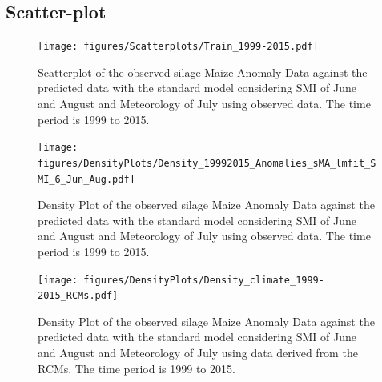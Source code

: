 \documentclass[12pt]{iopart}
\begin{document}
\subsection{Scatter-plot}

\label{scatter:1}

\begin{figure}
	\label{scatter:1f}
	\centering
	\texttt{[image: figures/Scatterplots/Train\_1999-2015.pdf]}
	\caption{Scatterplot of the observed silage Maize Anomaly Data against the predicted data with the standard model considering SMI of June and August and
		Meteorology of July using observed data. The time period is 1999 to 2015.}
\end{figure}


\begin{figure}
	\label{density:1f}
	\centering
	\texttt{[image: figures/DensityPlots/Density\_19992015\_Anomalies\_sMA\_lmfit\_SMI\_6\_Jun\_Aug.pdf]}
	\caption{Density Plot of the observed silage Maize Anomaly Data against the predicted data with the standard model considering SMI of June and August and
		Meteorology of July using observed data. The time period is 1999 to 2015.}
\end{figure}




\begin{figure}
	\label{density:2f}
	\centering
	\texttt{[image: figures/DensityPlots/Density\_climate\_1999-2015\_RCMs.pdf]}
	\caption{Density Plot of the observed silage Maize Anomaly Data against the predicted data with the standard model considering SMI of June and August and
		Meteorology of July using data derived from the RCMs. The time period is 1999 to 2015.}
\end{figure}
\end{document}
